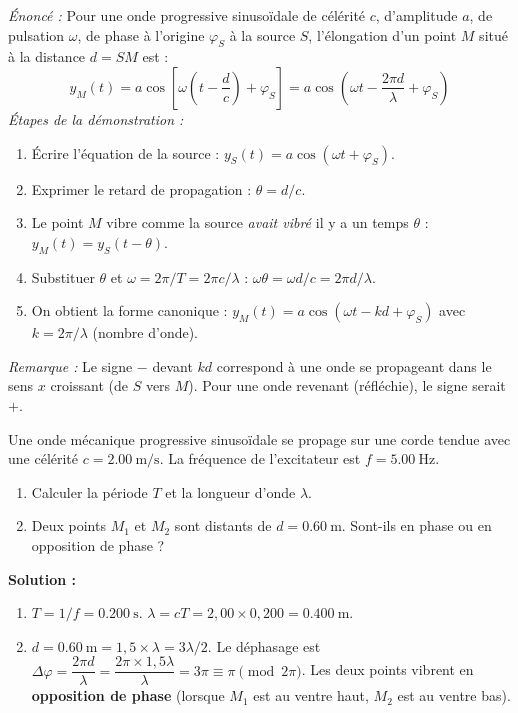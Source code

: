 \documentclass[11pt]{article}
\begin{document}
\begin{propriete}
\emph{Énoncé :} Pour une onde progressive sinusoïdale de célérité $c$, d'amplitude $a$, de pulsation $\omega$, de phase à l'origine $\varphi_S$ à la source $S$, l'élongation d'un point $M$ situé à la distance $d = SM$ est :
\[ y_M(t) = a \cos\left[ \omega\left(t - \frac{d}{c}\right) + \varphi_S \right] = a \cos\left( \omega t - \frac{2\pi d}{\lambda} + \varphi_S \right) \]
\emph{Étapes de la démonstration :}
\begin{enumerate}
    \item Écrire l'équation de la source : $y_S(t) = a \cos(\omega t + \varphi_S)$.
    \item Exprimer le retard de propagation : $\theta = d/c$.
    \item Le point $M$ vibre comme la source \emph{avait vibré} il y a un temps $\theta$ : $y_M(t) = y_S(t - \theta)$.
    \item Substituer $\theta$ et $\omega = 2\pi/T = 2\pi c/\lambda$ : $\omega\theta = \omega d/c = 2\pi d/\lambda$.
    \item On obtient la forme canonique : $y_M(t) = a \cos(\omega t - k d + \varphi_S)$ avec $k = 2\pi/\lambda$ (nombre d'onde).
\end{enumerate}
\emph{Remarque :} Le signe $-$ devant $kd$ correspond à une onde se propageant dans le sens $x$ croissant (de $S$ vers $M$). Pour une onde revenant (réfléchie), le signe serait $+$.
\end{propriete}

\begin{exemplebox}
Une onde mécanique progressive sinusoïdale se propage sur une corde tendue avec une célérité $c = \SI{2,00}{\meter\per\second}$. La fréquence de l'excitateur est $f = \SI{5,00}{\hertz}$.
\begin{enumerate}
    \item Calculer la période $T$ et la longueur d'onde $\lambda$.
    \item Deux points $M_1$ et $M_2$ sont distants de $d = \SI{0,60}{\meter}$. Sont-ils en phase ou en opposition de phase ?
\end{enumerate}
\textbf{Solution :}
\begin{enumerate}
    \item $T = 1/f = \SI{0,200}{\second}$.
    $\lambda = cT = 2,00 \times 0,200 = \SI{0,400}{\meter}$.
    \item $d = \SI{0,60}{\meter} = 1,5 \times \lambda = 3\lambda/2$.
    Le déphasage est $\Delta\varphi = \dfrac{2\pi d}{\lambda} = \dfrac{2\pi \times 1,5\lambda}{\lambda} = 3\pi \equiv \pi \pmod{2\pi}$.
    Les deux points vibrent en \textbf{opposition de phase} (lorsque $M_1$ est au ventre haut, $M_2$ est au ventre bas).
\end{enumerate}
\end{exemplebox}
\end{document}
